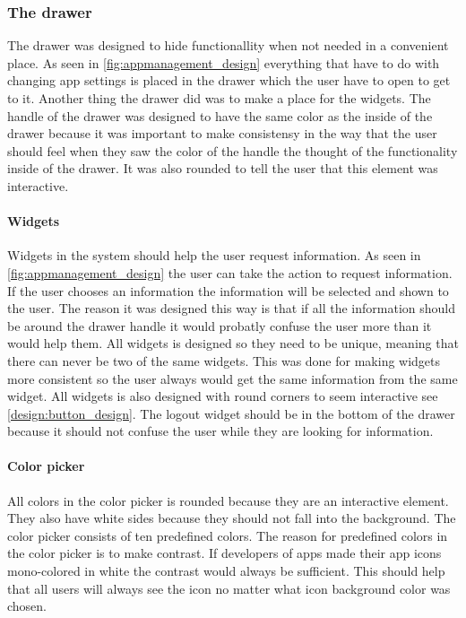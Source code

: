 \subsubsection{The drawer}
\label{sec:drawer}
The drawer was designed to hide functionallity when not needed in a convenient place. As seen in \autoref{fig:appmanagement_design} everything that have to do with changing app settings is placed in the drawer which the user have to open to get to it.
Another thing the drawer did was to make a place for the widgets.
The handle of the drawer was designed to have the same color as the inside of the drawer because it was important to make consistensy in the way that the user should feel when they saw the color of the handle the thought of the functionality inside of the drawer. It was also rounded to tell the user that this element was interactive.

\paragraph{Widgets}
\label{par:widgets}
Widgets in the \giraf[] system should help the user request information. As seen in \autoref{fig:appmanagement_design} the user can take the action to request information. If the user chooses an information the information will be selected and shown to the user.
The reason it was designed this way is that if all the information should be around the drawer handle it would probatly confuse the user more than it would help them.
All widgets is designed so they need to be unique, meaning that there can never be two of the same widgets. This was done for making widgets more consistent so the user always would get the same information from the same widget. All widgets is also designed with round corners to seem interactive see \autoref{design:button_design}.
The logout widget should be in the bottom of the drawer because it should not confuse the user while they are looking for information.

\paragraph{Color picker}
\label{par:colorpicker}
All colors in the color picker is rounded because they are an interactive element. They also have white sides because they should not fall into the background. The color picker consists of ten predefined colors.
The reason for predefined colors in the color picker is to make contrast. If developers of \giraf[] apps made their app icons mono-colored in white the contrast would always be sufficient. This should help that all users will always see the icon no matter what icon background color was chosen.